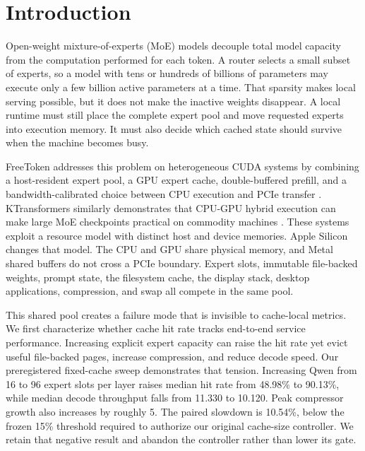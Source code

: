 \section{Introduction}
\label{sec:introduction}

Open-weight mixture-of-experts (MoE) models decouple total model capacity from
the computation performed for each token. A router selects a small subset of
experts, so a model with tens or hundreds of billions of parameters may execute
only a few billion active parameters at a time. That sparsity makes local
serving possible, but it does not make the inactive weights disappear. A local
runtime must still place the complete expert pool and move requested experts
into execution memory. It must also decide which cached state should survive
when the machine becomes busy.

FreeToken addresses this problem on heterogeneous CUDA systems by combining a
host-resident expert pool, a GPU expert cache, double-buffered prefill, and a
bandwidth-calibrated choice between CPU execution and PCIe transfer
\cite{yang2026freetoken}. KTransformers similarly demonstrates that CPU-GPU
hybrid execution can make large MoE checkpoints practical on commodity
machines \cite{chen2025ktransformers}. These systems exploit a resource model
with distinct host and device memories. Apple Silicon changes that model. The
CPU and GPU share physical memory, and Metal shared buffers do not cross a PCIe
boundary. Expert slots, immutable file-backed weights, prompt state, the
filesystem cache, the display stack, desktop applications, compression, and
swap all compete in the same pool.

This shared pool creates a failure mode that is invisible to cache-local
metrics. We first characterize whether cache hit rate tracks end-to-end service
performance. Increasing explicit expert capacity can raise the hit rate yet
evict useful file-backed pages, increase compression, and reduce decode speed.
Our preregistered fixed-cache sweep demonstrates that tension. Increasing Qwen
from 16 to 96 expert slots per layer raises median hit rate from 48.98\% to
90.13\%, while median decode throughput falls from 11.330 to 10.120\tps. Peak
compressor growth also increases by roughly 5\gib. The paired slowdown is
10.54\%, below the frozen 15\% threshold required to authorize our original
cache-size controller. We retain that negative result and abandon the
controller rather than lower its gate.

